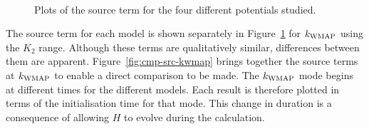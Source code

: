 \begin{figure}[htbp]
\centering%
\qquad%
\\%
\qquad%
\caption[Source Term for the Four Potentials]{Plots of the source
term for the
four different potentials studied.}
\label{fig:sourcecomparison-res}
\end{figure}
% 
The source term for each model is shown separately in Figure~\ref{fig:sourcecomparison-res} for
$k_\mathrm{WMAP}$ using the $K_2$ range\footnotemark. 
% 
% 
Although these terms are qualitatively similar,
differences between them are apparent. Figure~\ref{fig:cmp-src-kwmap} brings
together the source terms at $k_\mathrm{WMAP}$ to enable a direct comparison to be made. The
$k_\mathrm{WMAP}$ mode begins at different times for the
different models. Each result is therefore plotted in terms of the
initialisation time for that mode.  This change in duration is a consequence of
allowing $H$ to evolve during the calculation. 

